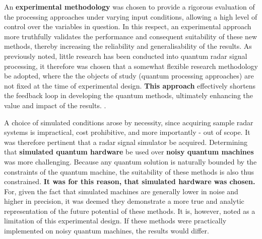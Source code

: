 An \textbf{experimental methodology} was chosen to provide a rigorous evaluation of the processing approaches under varying input conditions, allowing a high level of control over the variables in question.
In this respect, an experimental approach more truthfully validates the performance and consequent suitability of these new methods, thereby increasing the reliability and generalisability of the results.
As previously noted, little research has been conducted into quantum radar signal processing, it therefore was chosen that a somewhat flexible research methodology \cite{anastas_research_1999} be adopted, where the the objects of study (quantum processing approaches) are not fixed at the time of experimental design.
\textbf{This approach} effectively shortens the feedback loop in developing the quantum methods, ultimately enhancing the value and impact of the results. \cite{karahasanovic_collecting_2005}.

A choice of simulated conditions arose by necessity, since acquiring sample radar systems is impractical, cost prohibitive, and more importantly - out of scope.
It was therefore pertinent that a radar signal simulator be acquired.
Determining that \textbf{simulated quantum hardware} be used over \textbf{noisy quantum machines} was more challenging. 
Because any quantum solution is naturally bounded by the constraints of the quantum machine, the suitability of these methods is also thus constrained.
\textbf{It was for this reason, that simulated hardware was chosen.}
For, given the fact that simulated machines are generally lower in noise and higher in precision, it was deemed they demonstrate a more true and analytic representation of the future potential of these methods.
It is, however, noted as a limitation of this experimental design. If these methods were practically implemented on noisy quantum machines, the results would differ. 


